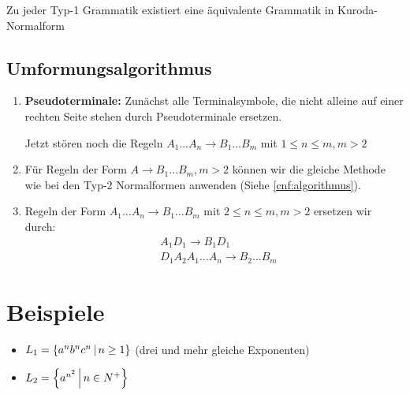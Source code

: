 Zu jeder Typ-1 Grammatik existiert eine äquivalente Grammatik in Kuroda-Normalform


\subsection{Umformungsalgorithmus}
\begin{enumerate}
	\item \textbf{Pseudoterminale:}
	Zunächst alle Terminalsymbole, die nicht alleine auf einer rechten Seite stehen durch Pseudoterminale ersetzen.

	Jetzt stören noch die Regeln $A_1\ldots A_n\rightarrow B_1\ldots B_m$ mit $1\leq n\leq m, m>2$

	\item Für Regeln der Form $A\rightarrow B_1\ldots B_m, m>2$ können wir die gleiche Methode wie bei den Typ-2 Normalformen anwenden (Siehe \autoref{cnf:algorithmus}).

	\item Regeln der Form $A_1\ldots A_n\rightarrow B_1\ldots B_m$ mit $2\leq n\leq m, m>2$ ersetzen wir durch:
	\begin{align*}
		&A_1D_1\rightarrow B_1D_1\\
		&D_1A_2A_1\ldots A_n\rightarrow B_2\ldots B_m
	\end{align*}
\end{enumerate}

\section{Beispiele}
\begin{itemize}
	\item $L_1=\left\{ a^nb^nc^n \,\middle|\, n\geq 1 \right\}$ (drei und mehr gleiche Exponenten)
	\item $L_2=\left\{ a^{n^2} \,\middle|\, n\in N^+ \right\}$
\end{itemize}
